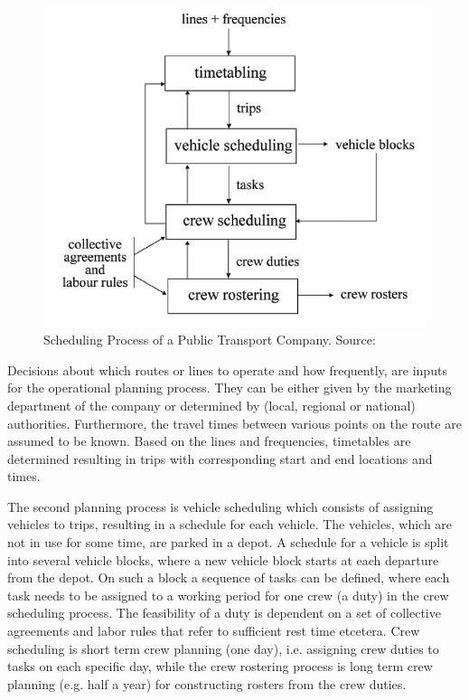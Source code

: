 \documentclass[12pt, oneside]{report}
\begin{document}
\begin {figure} [h!]
\centering
\includegraphics {genericSchedulingProcess}
\caption [Scheduling Process of a Public Transport Company] {Scheduling Process of a Public Transport Company. Source: \citep{Huisman2004}}
\label {image-genericSchedulingProcess}
\end {figure}

Decisions about which routes or lines to operate and how frequently, are inputs for the operational planning process. They can be either given by the marketing department of the company or determined by (local, regional or national) authorities. Furthermore, the travel times between various points on the route are assumed to be known. Based on the lines and frequencies, timetables are determined resulting in trips with corresponding start and end locations and times.

The second planning process is vehicle scheduling which consists of assigning vehicles to trips, resulting in a schedule for each vehicle. The vehicles, which are not in use for some time, are parked in a depot. A schedule for a vehicle is split into several vehicle blocks, where a new vehicle block starts at each departure from the depot. On such a block a sequence of tasks can be defined, where each task needs to be assigned to a working period for one crew (a duty) in the crew scheduling process. The feasibility of a duty is dependent on a set of collective agreements and labor rules that refer to sufficient rest time etcetera. Crew scheduling is short term crew planning (one day), i.e. assigning crew duties to tasks on each specific day, while the crew rostering process is long term crew planning (e.g. half a year) for constructing rosters from the crew duties.
\end{document}
